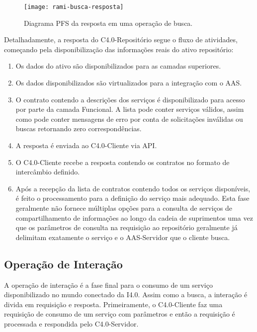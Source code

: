 \begin{figure}[htb]
	\centering
	\texttt{[image: rami-busca-resposta]}
	\caption{Diagrama PFS da resposta em uma operação de busca.}
	\label{fig:rami-busca-resposta}
\end{figure}

Detalhadamente, a resposta do C4.0-Repositório segue o fluxo de atividades, começando pela disponibilização das informações reais do ativo repositório:

\begin{enumerate}
	\item Os dados do ativo são disponibilizados para as camadas superiores.

	\item Os dados disponibilizados são virtualizados para a integração com o AAS.

	\item O contrato contendo a descrições dos serviços é disponibilizado para acesso por parte da camada Funcional. A lista  pode conter serviços válidos, assim como pode conter mensagens de erro por conta de solicitações inválidas ou buscas retornando zero correspondências.

	\item A resposta é enviada ao C4.0-Cliente via API.

	\item O C4.0-Cliente recebe a resposta contendo os contratos no formato de intercâmbio definido.

	\item Após a recepção da lista de contratos contendo todos os serviços disponíveis, é feito o processamento para a definição do serviço mais adequado. Esta fase geralmente não fornece múltiplas opções para a consulta de serviços de compartilhamento de informações ao longo da cadeia de suprimentos uma vez que os parâmetros de consulta na requisição ao repositório geralmente já delimitam exatamente o serviço e o AAS-Servidor que o cliente busca.
\end{enumerate}

\subsection{Operação de Interação}

A operação de interação é a fase final para o consumo de um serviço disponibilizado no mundo conectado da I4.0. Assim como a busca, a interação é divida em requisição e resposta. Primeiramente, o C4.0-Cliente faz uma requisição de consumo de um serviço com parâmetros e então a requisição é processada e respondida pelo C4.0-Servidor.

